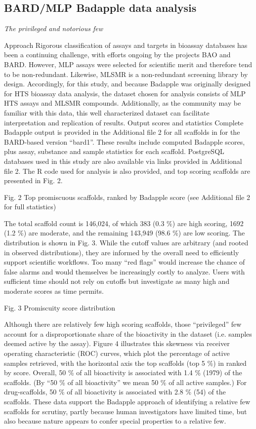 \subsection{BARD/MLP Badapple data analysis}

\emph{The privileged and notorious few}

Approach Rigorous classification of assays and targets in bioassay databases has been a continuing challenge, with efforts ongoing by the projects BAO and BARD. However, MLP assays were selected for scientific merit and therefore tend to be non-redundant. Likewise, MLSMR is a non-redundant screening library by design. Accordingly, for this study, and because Badapple was originally designed for HTS bioassay data analysis, the dataset chosen for analysis consists of MLP HTS assays and MLSMR compounds. Additionally, as the community may be familiar with this data, this well characterized dataset can facilitate interpretation and replication of results.
Output scores and statistics Complete Badapple output is provided in the Additional file 2 for all scaffolds in for the BARD-based version “bard1”. These results include computed Badapple scores, plus assay, substance and sample statistics for each scaffold. PostgreSQL databases used in this study are also available via links provided in Additional file 2. The R code used for analysis is also provided, and top scoring scaffolds are presented in Fig. 2.

Fig. 2 Top promiscuous scaffolds, ranked by Badapple score (see Additional file 2 for full statistics)

The total scaffold count is 146,024, of which 383 (0.3 \%) are high scoring, 1692 (1.2 \%) are moderate, and the remaining 143,949 (98.6 \%) are low scoring. The distribution is shown in Fig. 3. While the cutoff values are arbitrary (and rooted in observed distributions), they are informed by the overall need to efficiently support scientific workflows. Too many “red flags” would increase the chance of false alarms and would themselves be increasingly costly to analyze. Users with sufficient time should not rely on cutoffs but investigate as many high and moderate scores as time permits.

Fig. 3 Promiscuity score distribution

Although there are relatively few high scoring scaffolds, those “privileged” few account for a disproportionate share of the bioactivity in the dataset (i.e. samples deemed active by the assay). Figure 4 illustrates this skewness via receiver operating characteristic (ROC) curves, which plot the percentage of active samples retrieved, with the horizontal axis the top scaffolds (top 5 \%) in ranked by score. Overall, 50 \% of all bioactivity is associated with 1.4 \% (1979) of the scaffolds. (By “50 \% of all bioactivity” we mean 50 \% of all active samples.) For drug-scaffolds, 50 \% of all bioactivity is associated with 2.8 \% (54) of the scaffolds. These data support the Badapple approach of identifying a relative few scaffolds for scrutiny, partly because human investigators have limited time, but also because nature appears to confer special properties to a relative few.


